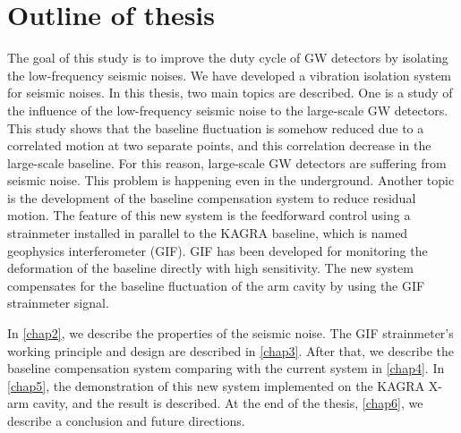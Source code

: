 \section{Outline of thesis} \label{sec:15}
The goal of this study is to improve the duty cycle of GW detectors by isolating the low-frequency seismic noises. We have developed a vibration isolation system for seismic noises. In this thesis, two main topics are described. One is a study of the influence of the low-frequency seismic noise to the large-scale GW detectors. This study shows that the baseline fluctuation is somehow reduced due to a correlated motion at two separate points, and this correlation decrease in the large-scale baseline. For this reason, large-scale GW detectors are suffering from seismic noise. This problem is happening even in the underground. Another topic is the development of the baseline compensation system to reduce residual motion. The feature of this new system is the feedforward control using a strainmeter installed in parallel to the KAGRA baseline, which is named geophysics interferometer (GIF). GIF has been developed for monitoring the deformation of the baseline directly with high sensitivity. The new system compensates for the baseline fluctuation of the arm cavity by using the GIF strainmeter signal.

In \cref{chap2}, we describe the properties of the seismic noise. The GIF strainmeter's working principle and design are described in \cref{chap3}. After that, we describe the baseline compensation system comparing with the current system in \cref{chap4}. In \cref{chap5}, the demonstration of this new system implemented on the KAGRA X-arm cavity, and the result is described. At the end of the thesis, \cref{chap6}, we describe a conclusion and future directions.



